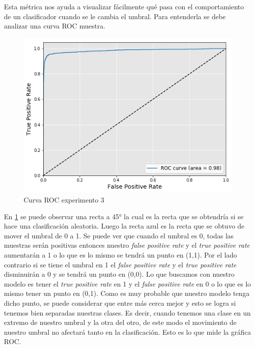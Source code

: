 \par Esta métrica nos ayuda a visualizar fácilmente qué pasa con el comportamiento de un clasificador cuando se le cambia el umbral. Para entenderla se debe analizar una curva ROC muestra.

\begin{figure}[H]
	\centering
	\includegraphics[width=\linewidth]{imagenes/ROC_Exp3_1.png}
	\caption{Curva ROC experimento 3}
	\label{fig:ROCMuestra}
\end{figure}

\par En \ref{fig:ROCMuestra} se puede observar una recta a \ang{45} la cual es la recta que se obtendría si se hace una clasificación aleatoria. Luego la recta azul es la recta que se obtuvo de mover el umbral de 0 a 1. Se puede ver que cuando el umbral es 0, todas las muestras serán positivas entonces nuestro \textit{false positive rate} y el  \textit{true positive rate} aumentarán a 1 o lo que es lo mismo se tendrá un punto en (1,1). Por el lado contrario si se tiene el umbral en 1 el \textit{false positive rate} y el  \textit{true positive rate} disminuirán a 0 y se tendrá un punto en (0,0). Lo que buscamos con nuestro modelo es tener el \textit{true positive rate} en 1 y el \textit{false positive rate} en 0 o lo que es lo mismo tener un punto en (0,1). Como es muy probable que nuestro modelo tenga dicho punto, se puede considerar que entre más cerca mejor y esto se logra si tenemos bien separadas nuestras clases. Es decir, cuando tenemos una clase en un extremo de nuestro umbral y la otra del otro, de este modo el movimiento de nuestro umbral no afectará tanto en la clasificación. Esto es lo que mide la gráfica ROC.

